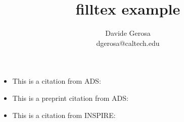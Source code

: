 \documentclass[]{article}
\begin{document}
\title{filltex example}

\author{Davide Gerosa\\dgerosa@caltech.edu}

\maketitle


\begin{itemize}
\item This is a citation from ADS: \cite{2016PhRvL.116f1102A}
\item This is a preprint citation from ADS: \cite{2016arXiv160203837T}
\item This is a citation from INSPIRE: \cite{Abbott:2016blz}
\end{itemize}



\end{document}
